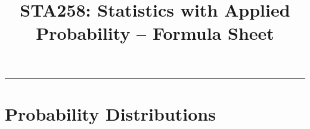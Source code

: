 \documentclass{article}
\newcommand{\HRule}{\rule{\linewidth}{0.25mm}}
\begin{document}

\date{}

\title{\vspace{-1.750cm} 
	\Large
	\textbf{
		STA258: Statistics with Applied Probability --
    		Formula Sheet}
	}

\maketitle

\vspace{-1.75cm}
\HRule

\large


\vspace*{-0.50cm}
\section*{Probability Distributions}
\end{document}
